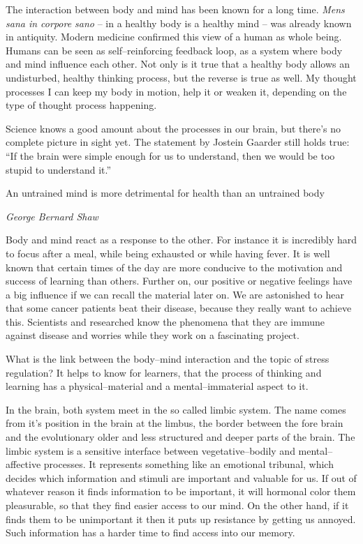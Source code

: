 \documentclass[../main.tex]{subfiles}
\begin{document}
The interaction between body and mind has been known for a long time.
\emph{Mens sana in corpore sano} -- in a healthy body is a healthy mind -- was already known in antiquity.
Modern medicine confirmed this view of a human as whole being.
Humans can be seen as self--reinforcing feedback loop, as a system where body and mind influence each other.
Not only is it true that a healthy body allows an undisturbed, healthy thinking process, but the reverse is true as well.
My thought processes I can keep my body in motion, help it or weaken it, depending on the type of thought process happening.

Science knows a good amount about the processes in our brain, but there's no complete picture in sight yet. The statement by Jostein Gaarder still holds true: ``If the brain were simple enough for us to understand, then we would be too stupid to understand it.''

\epigraph{An untrained mind is more detrimental for health than an untrained body}{\textit{George Bernard Shaw}}

Body and mind react as a response to the other.
For instance it is incredibly hard to focus after a meal, while being exhausted or while having fever.
It is well known that certain times of the day are more conducive to the motivation and success of learning than others.
Further on, our positive or negative feelings have a big influence if we can recall the material later on.
We are astonished to hear that some cancer patients beat their disease, because they really want to achieve this. Scientists and researched know the phenomena that they are immune against disease and worries while they work on a fascinating project.

What is the link between the body--mind interaction and the topic of stress regulation? It helps to know for learners, that the process of thinking and learning has a physical--material and a mental--immaterial aspect to it.

In the brain, both system meet in the so called limbic system.
The name comes from it's position in the brain at the limbus, the border between the fore brain and the evolutionary older and less structured and deeper parts of the brain.
The limbic system is a sensitive interface between vegetative--bodily and mental--affective processes. It represents something like an emotional tribunal, which decides which information and stimuli are important and valuable for us.
If out of whatever reason it finds information to be important, it will hormonal color them pleasurable, so that they find easier access to our mind.
On the other hand, if it finds them to be unimportant it then it puts up resistance by getting us annoyed. Such information has a harder time to find access into our memory.
\end{document}
